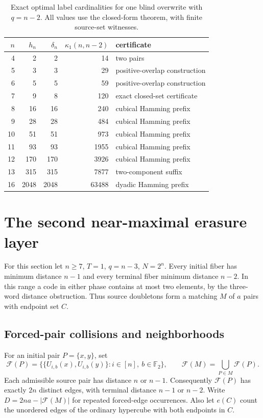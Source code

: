 \documentclass[11pt,a4paper]{article}
\newcommand{\F}{\mathbb F_2}
\begin{document}
\begin{table}[htbp]\centering\small
\begin{tabular}{@{}rrrrl@{}}\toprule
$n$ & $h_n$ & $\delta_n$ & $\kappa_1(n,n-2)$ & certificate\\\midrule
4&2&2&14&two pairs\\
5&3&3&29&positive-overlap construction\\
6&5&5&59&positive-overlap construction\\
7&9&8&120&exact closed-set certificate\\
8&16&16&240&cubical Hamming prefix\\
9&28&28&484&cubical Hamming prefix\\
10&51&51&973&cubical Hamming prefix\\
11&93&93&1955&cubical Hamming prefix\\
12&170&170&3926&cubical Hamming prefix\\
13&315&315&7877&two-component suffix\\
16&2048&2048&63488&dyadic Hamming prefix\\\bottomrule
\end{tabular}
\caption{Exact optimal label cardinalities for one blind overwrite with $q=n-2$. All values use the closed-form theorem, with finite source-set witnesses.}\label{tab:v7all}
\end{table}



\section{The second near-maximal erasure layer}\label{sec:nextlayer}
For this section let $n\ge7$, $T=1$, $q=n-3$, $N=2^n$. Every initial fiber has minimum distance $n-1$ and every terminal fiber minimum distance $n-2$. In this range a code in either phase contains at most two elements, by the three-word distance obstruction. Thus source doubletons form a matching $M$ of $a$ pairs with endpoint set $C$.
\subsection{Forced-pair collisions and neighborhoods}
For an initial pair $P=\{x,y\}$, set
\[
 \mathcal F(P)=\bigl\{\{U_{i,b}(x),U_{i,b}(y)\}: i\in[n],\ b\in\F\bigr\},
 \qquad \mathcal F(M)=\bigcup_{P\in M}\mathcal F(P).
\]
Each admissible source pair has distance $n$ or $n-1$. Consequently $\mathcal F(P)$ has exactly $2n$ distinct edges, with terminal distance $n-1$ or $n-2$. Write $D=2na-|\mathcal F(M)|$ for repeated forced-edge occurrences. Also let $e(C)$ count the unordered edges of the ordinary hypercube with both endpoints in $C$.
\end{document}
